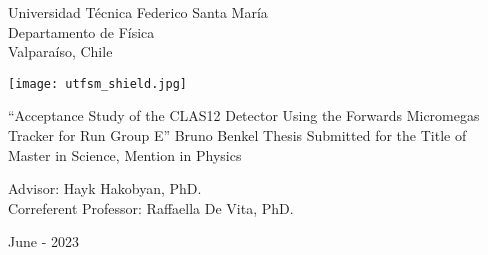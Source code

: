 \begin{titlepage}
\begin{center}
    \noindent
    \fontsize{18pt}{22pt}\selectfont Universidad T\'ecnica Federico Santa Mar\'ia \\
    \fontsize{16pt}{19pt}\selectfont Departamento de F\'isica \\
    \fontsize{16pt}{19pt}\selectfont Valpara\'iso, Chile \\
    \vspace{1.5cm}

    \texttt{[image: utfsm\_shield.jpg]}
    \vspace{1.5cm}

    \fontsize{20pt}{24pt}\selectfont ``Acceptance Study of the CLAS12 Detector Using the Forwards Micromegas Tracker for Run Group E''
    \vfill
    \fontsize{16pt}{19pt}\selectfont Bruno Benkel
    \vfill
    \fontsize{16pt}{19pt}\selectfont Thesis Submitted for the Title of \\ Master in Science, Mention in Physics
    \vspace{1.5cm}

    \fontsize{14pt}{17pt}\selectfont Advisor: Hayk Hakobyan, PhD. \\
    \fontsize{14pt}{17pt}\selectfont Correferent Professor: Raffaella De Vita, PhD. %
    \vspace{2.5cm}

    \fontsize{14pt}{17pt}\selectfont June - 2023
\end{center}
\end{titlepage}

       \pagebreak
 \pagebreak
         \pagebreak
         \pagebreak
\tableofcontents                         \pagebreak
{} {}
\listoffigures                           \pagebreak
